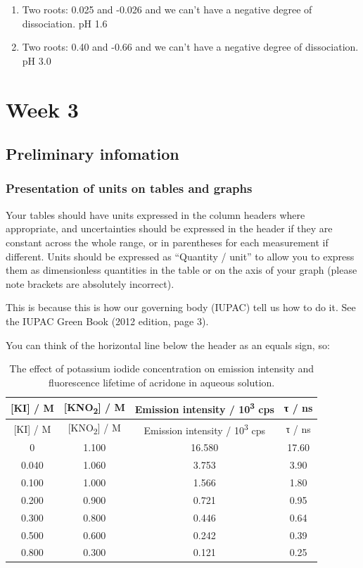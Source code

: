 \documentclass[
]{book}
\providecommand{\tightlist}{%
  \setlength{\itemsep}{0pt}\setlength{\parskip}{0pt}}
\begin{document}
\begin{enumerate}
\def\labelenumi{\alph{enumi}.}
\tightlist
\item
  Two roots: 0.025 and -0.026 and we can't have a negative degree of dissociation.
  pH 1.6
\item
  Two roots: 0.40 and -0.66 and we can't have a negative degree of dissociation.
  pH 3.0
\end{enumerate}

\hypertarget{ch:Workshop3}{%
\chapter{Week 3}\label{ch:Workshop3}}

\hypertarget{sec:Prelim3}{%
\section{Preliminary infomation}\label{sec:Prelim3}}

\hypertarget{subsec:units}{%
\subsection{Presentation of units on tables and graphs}\label{subsec:units}}

Your tables should have units expressed in the column headers where appropriate, and uncertainties should be expressed in the header if they are constant across the whole range, or in parentheses for each measurement if different. Units should be expressed as ``Quantity / unit'' to allow you to express them as dimensionless quantities in the table or on the axis of your graph (please note brackets are absolutely incorrect).

This is because this is how our governing body (IUPAC) tell us how to do it. See the IUPAC Green Book (2012 edition, page 3).

You can think of the horizontal line below the header as an equals sign, so:

\begin{longtable}[]{@{}cccc@{}}
\caption{\label{tab:acridonequench} The effect of potassium iodide concentration on emission intensity and fluorescence lifetime of acridone in aqueous solution.}\tabularnewline
\toprule
{[}KI{]} / M & {[}KNO\textsubscript{2}{]} / M & Emission intensity / 10\textsuperscript{3} cps & τ / ns\tabularnewline
\midrule
\endfirsthead
\toprule
{[}KI{]} / M & {[}KNO\textsubscript{2}{]} / M & Emission intensity / 10\textsuperscript{3} cps & τ / ns\tabularnewline
\midrule
\endhead
0 & 1.100 & 16.580 & 17.60\tabularnewline
0.040 & 1.060 & 3.753 & 3.90\tabularnewline
0.100 & 1.000 & 1.566 & 1.80\tabularnewline
0.200 & 0.900 & 0.721 & 0.95\tabularnewline
0.300 & 0.800 & 0.446 & 0.64\tabularnewline
0.500 & 0.600 & 0.242 & 0.39\tabularnewline
0.800 & 0.300 & 0.121 & 0.25\tabularnewline
\bottomrule
\end{longtable}
\end{document}
